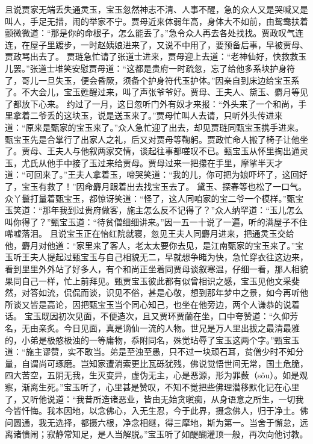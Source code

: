 \documentclass[12pt,oneside]{book}
\begin{document}
且说贾家无端丢失通灵玉，宝玉忽然神志不清、人事不醒，急的众人又是哭喊又是叫人，手足无措，闹的举家不宁。贾母近来体弱年高，身体大不如前，由鸳鸯扶着颤微微道：“那是你的命根子，怎么能丢了。”急令众人再去各处找找。贾政叹气连连，在屋子里踱步，一时赵姨娘进来了，又说不中用了，要预备后事，早被贾母、贾政骂出去了。
贾琏急忙请了张道士进来，贾母迎上去道：“老神仙好，快救救玉儿罢。”张道士堆笑安慰贾母道：“这都是贵府一时疏忽，忘了给他多系块护身符了，哥儿一旦失玉，便会昏厥，须备个护身符代玉护体。”因亲自到床边给宝玉系了。不大会儿，宝玉甦醒过来，叫了声张爷爷好。贾母、王夫人、黛玉、麝月等见了都放下心来。
约过了一月，这日忽听门外有奴才来报：“外头来了一个和尚，手里拿着二爷丢的这块玉，说是送玉来了。”贾母忙叫人去请，只听外头传进来道：“原来是甄家的宝玉来了。”众人急忙迎了出去，却见贾琏同甄宝玉携手进来。甄宝玉先是合掌行了出家人之礼，后又对贾母等鞠躬。贾政忙命人搬了椅子让他坐了。贾母、王夫人与他叙两家交情，谈起往事都嗟叹不已。甄宝玉从怀里掏出通灵玉，尤氏从他手中接了玉过来给贾母。贾母过来一把攥在手里，摩挲半天才道：“可回来了。”王夫人拿着玉，啼哭笑道：“我的儿，你可把为娘吓坏了，这回好了，宝玉有救了！”因命麝月跟着出去找宝玉去了。
黛玉、探春等也松了一口气。众丫鬟打量着甄宝玉，都惊讶笑道：“怪了，这人同咱家的宝二爷一个模样。”甄宝玉笑道：“那年我到过贵府做客，施主怎么反不记得了？”众人纳罕道：“玉儿怎么叫你得了？”甄宝玉道：“待贫僧细细讲来。”因一五一十说了一遍，听的满屋子不住唏嘘落泪。
且说宝玉正在怡红院就寝，忽见王夫人同麝月进来，把通灵玉交给他，麝月对他道：“家里来了客人，老太太要你去见，是江南甄家的宝玉来了。”宝玉听王夫人提起过甄宝玉与自己相貌无二，早就想争睹为快，急忙穿衣往这边来，看到里里外外站了好多人，有个和尚正坐着同贾母谈叙寒温，仔细一看，那人相貌果同自己一样，忙上前拜见。甄贾宝玉彼此都有似曾相识之感，宝玉见他文采斐然，对答如流，侃侃而谈，识见不俗，甚是心敬，想到那年梦中之景，如今再听他所谈又皆是高论，因把甄宝玉当个同心知己，也坐在他旁边，两个人谦恭的说着话。
宝玉既因初次见面，不便造次，且又贾环贾蘭在坐，口中夸赞道：“久仰芳名，无由亲炙。今日见面，真是谪仙一流的人物。世兄是万人里出拔之最清最雅的，小弟是极憨极浊的一等庸物，忝附同名，殊觉玷辱了宝玉这两个字。”甄宝玉道：“施主谬赞，实不敢当。弟是至浊至愚，只不过一块顽石耳，贫僧少时不知分量，自谓尚可琢磨。岂知家遭消索更比瓦砾犹残，佛说觉悟世间无常，国土危脆，四大苦空，五阴无我，生灭变异，虚伪无主，心是恶源，形为罪薮（sǒu）。如是观察，渐离生死。”宝玉听了，心里甚是赞叹，不知不觉把些佛理潜移默化记在心里了，又听他说道：“我昔所造诸恶业，皆由无始贪瞋痴，从身语意之所生，一切我今皆忏悔。我本因地，以念佛心，入无生忍，今于此界，摄念佛人，归于净土。佛问圆通，我无选择，都摄六根，净念相继，得三摩地，斯为第一。当舍于懈怠，远离诸愦闹；寂静常知足，是人当解脱。”宝玉听了如醍醐灌顶一般，再次向他讨教。
\end{document}
